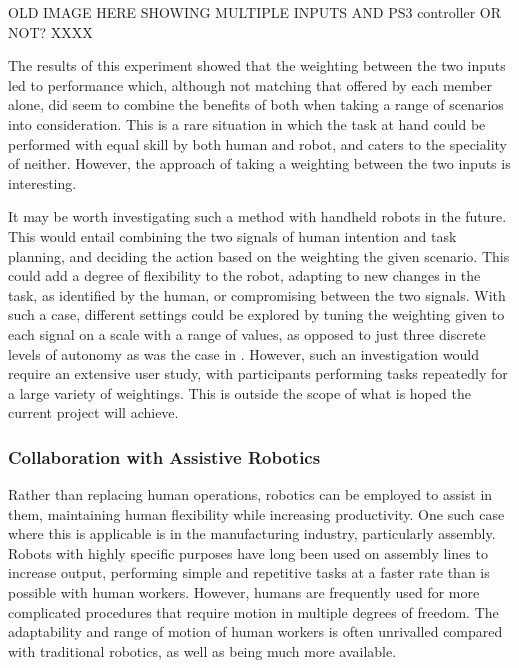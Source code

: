 \documentclass[11pt]{article}
\begin{document}
OLD IMAGE HERE SHOWING MULTIPLE INPUTS AND PS3 controller OR NOT? XXXX

The results of this experiment showed that the weighting between the two inputs led to performance which, although not matching that offered by each member alone, did seem to combine the benefits of both when taking a range of scenarios into consideration. This is a rare situation in which the task at hand could be performed with equal skill by both human and robot, and caters to the speciality of neither. However, the approach of taking a weighting between the two inputs is interesting. 

It may be worth investigating such a method with handheld robots in the future. This would entail combining the two signals of human intention and task planning, and deciding the action based on the weighting the given scenario. This could add a degree of flexibility to the robot, adapting to new changes in the task, as identified by the human, or compromising between the two signals. With such a case, different settings could be explored by tuning the weighting given to each signal on a scale with a range of values, as opposed to just three discrete levels of autonomy as was the case in \cite{GreggSmithDesign}. However, such an investigation would require an extensive user study, with participants performing tasks repeatedly for a large variety of weightings. This is outside the scope of what is hoped the current project will achieve.

\subsubsection{Collaboration with Assistive Robotics}
Rather than replacing human operations, robotics can be employed to assist in them, maintaining human flexibility while increasing productivity. One such case where this is applicable is in the manufacturing industry, particularly assembly. Robots with highly specific purposes have long been used on assembly lines to increase output, performing simple and repetitive tasks at a faster rate than is possible with human workers. However, humans are frequently used for more complicated procedures that require motion in multiple degrees of freedom. The adaptability and range of motion of human workers is often unrivalled compared with traditional robotics, as well as being much more available. 
\end{document}

